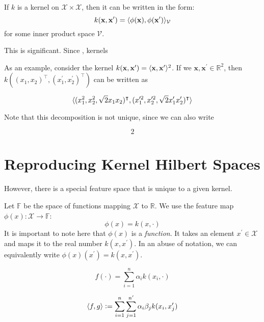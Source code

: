 \begin{theorem}
If $k$ is a kernel on $\mathcal{X} \times \mathcal{X}$, then it can be written in the form:
\begin{equation}
  k(\mathbf{x}, \mathbf{x}^\prime) = \langle\phi(\mathbf{x}), \phi(\mathbf{x}^\prime)\rangle_\mathcal{V}
\end{equation}
for some inner product space $\mathcal{V}$.
\end{theorem}


This is significant. Since , kernels 

As an example, consider the kernel $k(\mathbf{x}, \mathbf{x}^\prime) = \langle\mathbf{x}, \mathbf{x}^\prime\rangle^2$. If we $\mathbf{x}, \mathbf{x}^\prime \in \mathbb{R}^2$, then $k((x_1, x_2)^\intercal, (x_1^\prime, x_2^\prime)^\intercal)$ can be written as

\begin{equation}
\langle(x_1^2, x_2^2, \sqrt{2} x_1 x_2)^\intercal, (x_1^{\prime 2}, x_2^{\prime 2}, \sqrt{2} x_1^\prime x_2^\prime)^\intercal\rangle
\end{equation}

Note that this decomposition is not unique, since we can also write

\begin{equation}
2
\end{equation}

\section{Reproducing Kernel Hilbert Spaces}
However, there is a special feature space that is unique to a given kernel. 

Let $\mathbb{F}$ be the space of functions mapping $\mathcal{X}$ to $\mathbb{R}$. We use the feature map $\phi(x) : \mathcal{X} \to \mathbb{F}$:
\begin{equation}
	\phi(x) = k(x, \cdot)
\end{equation}
It is important to note here that $\phi(x)$ is a \emph{function}. It takes an element $x^\prime \in \mathcal{X}$ and maps it to the real number $k(x, x^\prime)$. In an abuse of notation, we can equivalently write $\phi(x)(x^\prime) = k(x, x^\prime)$.

\begin{equation}
	f(\cdot) = \sum_{i=1}^n \alpha_i k(x_i, \cdot)
\end{equation}

\begin{equation}
	\langle f, g\rangle \vcentcolon= \sum_{i=1}^n \sum_{j=1}^{n^\prime} \alpha_i \beta_j k(x_i, x_j^\prime)
\end{equation}

